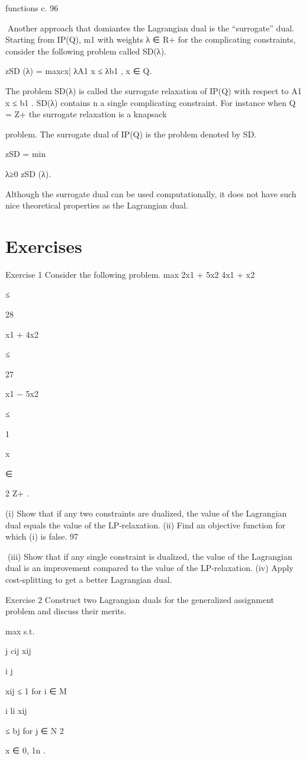 functions c.
96

Another approach that domiantes the Lagrangian dual is the “surrogate” dual. Starting from IP(Q),
m1
with weights λ ∈ R+
for the complicating constraints, consider the following problem called SD(λ).

zSD (λ) = max{cx| λA1 x ≤ λb1 , x ∈ Q}.

The problem SD(λ) is called the surrogate relaxation of IP(Q) with respect to A1 x ≤ b1 . SD(λ) contains
n
a single complicating constraint. For instance when Q = Z+
the surrogate relaxation is a knapsack

problem. The surrogate dual of IP(Q) is the problem denoted by SD.

zSD = min

λ≥0 zSD (λ).

Although the surrogate dual can be used computationally, it does not have such nice theoretical properties
as the Lagrangian dual.

\section*{Exercises}
Exercise 1
Consider the following problem.
max 2x1 + 5x2
4x1 + x2

≤

28

x1 + 4x2

≤

27

x1 − 5x2

≤

1

x

∈

2
Z+
.

(i) Show that if any two constraints are dualized, the value of the Lagrangian dual equals the value of
the LP-relaxation.
(ii) Find an objective function for which (i) is false.
97

(iii) Show that if any single constraint is dualized, the value of the Lagrangian dual is an improvement
compared to the value of the LP-relaxation.
(iv) Apply cost-splitting to get a better Lagrangian dual.

Exercise 2
Construct two Lagrangian duals for the generalized assignment problem and discuss their merits.

max
s.t.

j cij xij

i
j

xij ≤ 1 for i ∈ M

i li xij

≤ bj for j ∈ N
2

x ∈ {0, 1}n .